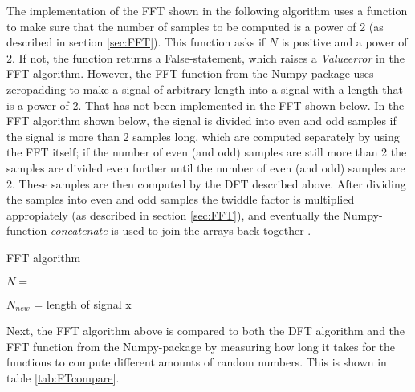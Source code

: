 The implementation of the FFT shown in the following algorithm uses a function to make sure that the number of samples to be computed is a power of 2 (as described in section \ref{sec:FFT}). This function asks if $N$ is positive and a power of 2. If not, the function returns a False-statement, which raises a \textit{Valueerror} in the FFT algorithm. However, the FFT function from the Numpy-package uses zeropadding to make a signal of arbitrary length into a signal with a length that is a power of 2. That has not been implemented in the FFT shown below. In the FFT algorithm shown below, the signal is divided into even and odd samples if the signal is more than 2 samples long, which are computed separately by using the FFT itself; if the number of even (and odd) samples are still more than 2 the samples are divided even further until the number of even (and odd) samples are 2. These samples are then computed by the DFT described above. After dividing the samples into even and odd samples the twiddle factor is multiplied appropiately (as described in section \ref{sec:FFT}), and eventually the Numpy-function \textit{concatenate} is used to join the arrays back together .
\begin{algorithm}
\caption{FFT algorithm}
\label{FFTalg}
\begin{algorithmic}[1]
\State $N = $ 
\EndProcedure

	\State $N_{new}$ = length of signal x
	\Else
		 
		 
		 
	\EndIf
\EndProcedure
\end{algorithmic}
\end{algorithm}

Next, the FFT algorithm above is compared to both the DFT algorithm and the FFT function from the Numpy-package by measuring how long it takes for the functions to compute different amounts of random numbers. This is shown in table \ref{tab:FTcompare}.

